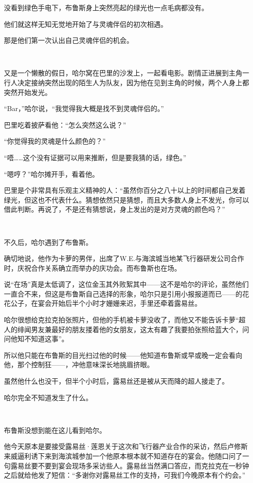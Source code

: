 \documentclass[../main.tex]{subfiles}
\begin{document}
没看到绿色手电下，布鲁斯身上突然亮起的绿光也一点毛病都没有。

他们就这样无知无觉地开始了与灵魂伴侣的初次相遇。

那是他们第一次认出自己灵魂伴侣的机会。

~\

又是一个懒散的假日，哈尔窝在巴里的沙发上，一起看电影。剧情正进展到主角一行人决定接纳突然出现的陌生人为队友，因为他在见到主角的时候，两个人身上都突然开始发光。

“Bar，”哈尔说，“我觉得我大概是找不到灵魂伴侣的。”

巴里吃着披萨看他：“怎么突然这么说？”

“你觉得我的灵魂是什么颜色的？”

“唔……这个没有证据可以用来推断，但是要我猜的话，绿色。”

“嗯哼？”哈尔摊开手，看着他。

巴里是个非常具有乐观主义精神的人：“虽然你百分之八十以上的时间都自己发着绿光，但这也不代表什么。猜想依然只是猜想，而且大多数人身上不发光，你可以借此判断。再说了，不是还有猜想说，身上发出的是对方灵魂的颜色吗？”

~\

不久后，哈尔遇到了布鲁斯。

确切地说，他作为卡萝的男伴，出席了W.E.与海滨城当地某飞行器研发公司合作时，庆祝合作关系确立而举办的庆功会。而布鲁斯也在场。

说“在场”真是太低调了，这位金玉其外败絮其中——这不是哈尔的评论，虽然他们一直合不来，但这是布鲁斯自己选择的形象，哈尔只是引用小报报道而已——的花花公子，在宴会开始后半个小时才姗姗来迟，手里还牵着露易丝。

哈尔很想给克拉克拍张照片，但他的手机被卡萝没收了，而他又不能告诉卡萝“超人的绯闻男友兼最好的朋友搂着他的女朋友，这太有趣了我要拍张照给蓝大个，问问他知不知道这事”。

所以他只能在布鲁斯的目光扫过他的时候——他知道布鲁斯或早或晚一定会看向他，那个控制狂——，冲他意味深长地挑眉挤眼。

虽然他什么也没干，但半个小时后，露易丝还是被从天而降的超人接走了。

哈尔完全不知道发生了什么。

~\

布鲁斯没想到能在这儿看到哈尔。

他今天原本是要接受露易丝·莲恩关于这次和飞行器产业合作的采访，然后卢修斯来威逼利诱下来到海滨城参加一个他原本根本就不知道存在的宴会。他随口问了一句露易丝要不要到宴会现场多采访些人。露易丝当然满口答应，而克拉克在一秒钟之后就给他发了短信：“多谢你对露易丝工作的支持，可我们今晚原本有个约会。”
\end{document}
